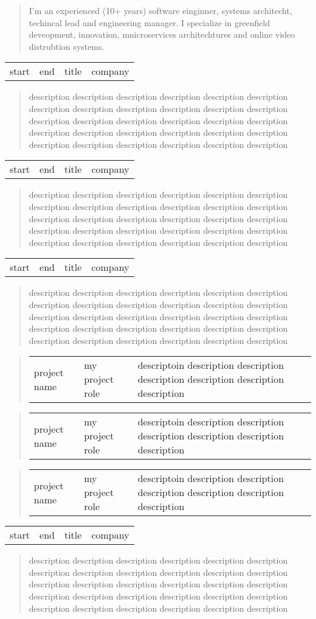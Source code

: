 \documentclass[11pt]{article}
\newcommand{\job}[5]{
  \begin{tabular}{llll}
    #1 & #2 & #3 & #4\\
  \end{tabular}
  \begin{quotation}
    \noindent#5
  \end{quotation} 
}
\newcommand{\icproject}[3]{
  \begin{quotation}
    \begin{tabular}{llp{3in}}
      #1 & #2 & #3\\ 
    \end{tabular}
  \end{quotation}
}
\begin{document}
\begin{quotation}
  \noindent I'm an experienced (10+ years) software einginner, systems architecht,
  techincal lead and engineering manager. I specialize in greenfield deveopment,
  innovation, mnicroservices architechtures and online video distrubtion
  systems.
\end{quotation}

\job{start}{end}{title}{company}{description description description description
  description description description description description description
  description description description description description description
  description description description description description description
  description description description description description description
  description description}

\job{start}{end}{title}{company}{description description description description
  description description description description description description
  description description description description description description
  description description description description description description
  description description description description description description
  description description}

\job{start}{end}{title}{company}{description description description description
  description description description description description description
  description description description description description description
  description description description description description description
  description description description description description description
  description description}

\icproject{project name}{my project role}{descriptoin description description description
  description description description}

\icproject{project name}{my project role}{descriptoin description description description
  description description description}

\icproject{project name}{my project role}{descriptoin description description description
  description description description}

\job{start}{end}{title}{company}{description description description description
  description description description description description description
  description description description description description description
  description description description description description description
  description description description description description description
  description description}
\end{document}

